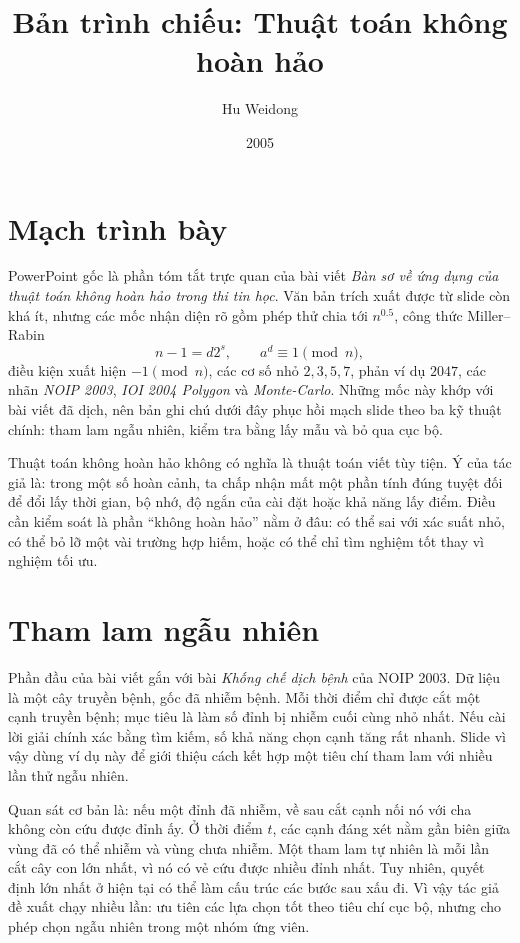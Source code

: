 \documentclass[11pt]{article}
\title{Bản trình chiếu: Thuật toán không hoàn hảo}
\author{Hu Weidong}
\date{2005}
\begin{document}
\maketitle


\section{Mạch trình bày}

PowerPoint gốc là phần tóm tắt trực quan của bài viết \emph{Bàn sơ về ứng
dụng của thuật toán không hoàn hảo trong thi tin học}. Văn bản trích xuất
được từ slide còn khá ít, nhưng các mốc nhận diện rõ gồm phép thử chia tới
\(n^{0.5}\), công thức Miller--Rabin
\[
  n-1=d2^s,\qquad a^d\equiv 1\pmod n,
\]
điều kiện xuất hiện \(-1\pmod n\), các cơ số nhỏ \(2,3,5,7\), phản ví dụ
\(2047\), các nhãn \textit{NOIP 2003}, \textit{IOI 2004 Polygon} và
\textit{Monte-Carlo}. Những mốc này khớp với bài viết đã dịch, nên bản ghi
chú dưới đây phục hồi mạch slide theo ba kỹ thuật chính: tham lam ngẫu nhiên,
kiểm tra bằng lấy mẫu và bỏ qua cục bộ.

Thuật toán không hoàn hảo không có nghĩa là thuật toán viết tùy tiện. Ý của
tác giả là: trong một số hoàn cảnh, ta chấp nhận mất một phần tính đúng tuyệt
đối để đổi lấy thời gian, bộ nhớ, độ ngắn của cài đặt hoặc khả năng lấy điểm.
Điều cần kiểm soát là phần ``không hoàn hảo'' nằm ở đâu: có thể sai với xác
suất nhỏ, có thể bỏ lỡ một vài trường hợp hiếm, hoặc có thể chỉ tìm nghiệm
tốt thay vì nghiệm tối ưu.

\section{Tham lam ngẫu nhiên}

Phần đầu của bài viết gắn với bài \textit{Khống chế dịch bệnh} của NOIP 2003.
Dữ liệu là một cây truyền bệnh, gốc đã nhiễm bệnh. Mỗi thời điểm chỉ được cắt
một cạnh truyền bệnh; mục tiêu là làm số đỉnh bị nhiễm cuối cùng nhỏ nhất.
Nếu cài lời giải chính xác bằng tìm kiếm, số khả năng chọn cạnh tăng rất
nhanh. Slide vì vậy dùng ví dụ này để giới thiệu cách kết hợp một tiêu chí
tham lam với nhiều lần thử ngẫu nhiên.

Quan sát cơ bản là: nếu một đỉnh đã nhiễm, về sau cắt cạnh nối nó với cha
không còn cứu được đỉnh ấy. Ở thời điểm \(t\), các cạnh đáng xét nằm gần biên
giữa vùng đã có thể nhiễm và vùng chưa nhiễm. Một tham lam tự nhiên là mỗi
lần cắt cây con lớn nhất, vì nó có vẻ cứu được nhiều đỉnh nhất. Tuy nhiên,
quyết định lớn nhất ở hiện tại có thể làm cấu trúc các bước sau xấu đi. Vì
vậy tác giả đề xuất chạy nhiều lần: ưu tiên các lựa chọn tốt theo tiêu chí
cục bộ, nhưng cho phép chọn ngẫu nhiên trong một nhóm ứng viên.
\end{document}
